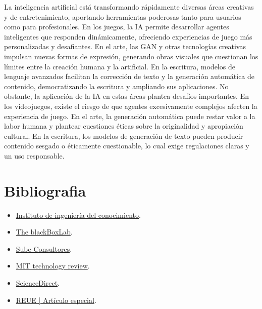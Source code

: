 \documentclass[12pt]{article}
\begin{document}
La inteligencia artificial está transformando rápidamente diversas áreas creativas y de entretenimiento, 
aportando herramientas poderosas tanto para usuarios como para profesionales. En los juegos, la IA permite desarrollar agentes 
inteligentes que responden dinámicamente, ofreciendo experiencias de juego más personalizadas y desafiantes. En el arte, las GAN y
otras tecnologías creativas impulsan nuevas formas de expresión, generando obras visuales que cuestionan los límites entre la creación humana
y la artificial. En la escritura, modelos de lenguaje avanzados facilitan la corrección de texto y la generación automática de contenido, 
democratizando la escritura y ampliando sus aplicaciones.
No obstante, la aplicación de la IA en estas áreas plantea desafíos importantes. En los videojuegos, existe el riesgo de que agentes 
excesivamente complejos afecten la experiencia de juego. En el arte, la generación automática puede restar valor a la labor humana y 
plantear cuestiones éticas sobre la originalidad y apropiación cultural. En la escritura, los modelos de generación de texto pueden 
producir contenido sesgado o éticamente cuestionable, lo cual exige regulaciones claras y un uso responsable.

\clearpage

\section{Bibliografia}
\begin{itemize}
    \item \href{https://www.iic.uam.es/innovacion/alphazero-y-el-go/}{Instituto de ingeniería del conocimiento}.
    \item \href{https://theblackboxlab.com/2024/02/23/deepmind/}{The blackBoxLab}.
    \item \href{https://www.linkedin.com/pulse/creatividad-artificial-est%C3%A1-la-ia-redefiniendo-el-concepto-e0djc/}{Sube Consultores}.
    \item \href{https://www.technologyreview.es/s/16532/que-es-la-inteligencia-artificial}{MIT technology review}.
    \item \href{https://www.sciencedirect.com/science/article/pii/S1136103423000114}{ScienceDirect}.
    \item \href{chrome-extension://efaidnbmnnnibpcajpcglclefindmkaj/https://www.reue.org/wp-content/uploads/2024/07/184-195.pdf}{REUE | Artículo especial}.


\end{itemize}
\end{document}
